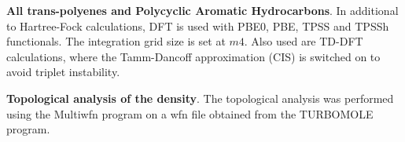 \documentclass[12pt]{article}
\begin{document}
\textbf{All trans-polyenes and Polycyclic Aromatic Hydrocarbons}. In additional to Hartree-Fock calculations, DFT is used with PBE0, PBE, TPSS and TPSSh functionals. \cite{pbe0,pbe,tpss,tpssh} The integration grid size is set at \(m4\). Also used are TD-DFT calculations, where the Tamm-Dancoff approximation (CIS) \cite{tammdancoff} is switched on to avoid triplet instability.

\textbf{Topological analysis of the density}. The topological analysis was performed using the Multiwfn
program on a wfn file obtained from the TURBOMOLE program.\cite{multiwfn}

\clearpage



%
%



\clearpage
\end{document}
